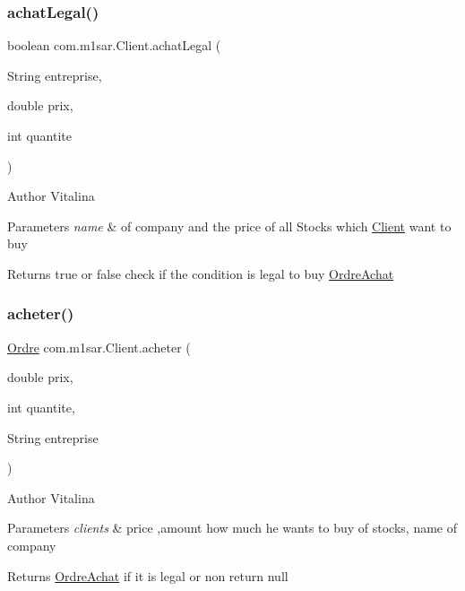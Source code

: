 \subsubsection{\texorpdfstring{achat\+Legal()}{achatLegal()}}
{\footnotesize\ttfamily boolean com.\+m1sar.\+Client.\+achat\+Legal (\begin{DoxyParamCaption}\item[{String}]{entreprise,  }\item[{double}]{prix,  }\item[{int}]{quantite }\end{DoxyParamCaption})}

\begin{DoxyAuthor}{Author}
Vitalina 
\end{DoxyAuthor}

\begin{DoxyParams}{Parameters}
{\em name} & of company and the price of all Stocks which \hyperlink{classcom_1_1m1sar_1_1_client}{Client} want to buy \\
\hline
\end{DoxyParams}
\begin{DoxyReturn}{Returns}
true or false check if the condition is legal to buy \hyperlink{classcom_1_1m1sar_1_1_ordre_achat}{Ordre\+Achat} 
\end{DoxyReturn}
\mbox{\label{classcom_1_1m1sar_1_1_client_a7042e50f398b3b9b7bbeada8f12954c2}} 
\subsubsection{\texorpdfstring{acheter()}{acheter()}}
{\footnotesize\ttfamily \hyperlink{classcom_1_1m1sar_1_1_ordre}{Ordre} com.\+m1sar.\+Client.\+acheter (\begin{DoxyParamCaption}\item[{double}]{prix,  }\item[{int}]{quantite,  }\item[{String}]{entreprise }\end{DoxyParamCaption})}

\begin{DoxyAuthor}{Author}
Vitalina 
\end{DoxyAuthor}

\begin{DoxyParams}{Parameters}
{\em clients} & price ,amount how much he wants to buy of stocks, name of company \\
\hline
\end{DoxyParams}
\begin{DoxyReturn}{Returns}
\hyperlink{classcom_1_1m1sar_1_1_ordre_achat}{Ordre\+Achat} if it is legal or non return null 
\end{DoxyReturn}
\mbox{\label{classcom_1_1m1sar_1_1_client_aeff9ee8926647a8be490c5f0beea31d5}} 
